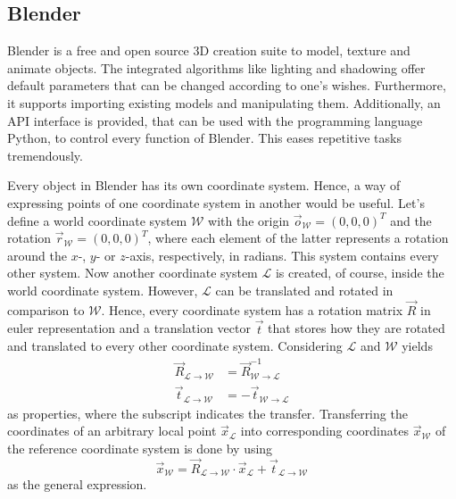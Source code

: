 \subsection{Blender}
\label{sec:software-blender}
Blender is a free and open source 3D creation suite to model, texture and animate objects.
The integrated algorithms like lighting and shadowing offer default parameters that can be changed according to one's wishes.
Furthermore, it supports importing existing models and manipulating them.
Additionally, an API interface is provided, that can be used with the programming language Python, to control every function of Blender.
This eases repetitive tasks tremendously.

Every object in Blender has its own coordinate system.
Hence, a way of expressing points of one coordinate system in another would be useful.
Let's define a world coordinate system $\mathcal{W}$ with the origin $\vec{o}_\mathcal{W} = (0,0,0)^T$ and the rotation $\vec{r}_{\mathcal{W}} = (0,0,0)^T$, where each element of the latter represents a rotation around the $x$-, $y$- or $z$-axis, respectively, in radians.
This system contains every other system.
Now another coordinate system $\mathcal{L}$ is created, of course, inside the world coordinate system.
However, $\mathcal{L}$ can be translated and rotated in comparison to $\mathcal{W}$.
Hence, every coordinate system has a rotation matrix $\vec{R}$ in euler representation and a translation vector $\vec{t}$ that stores how they are rotated and translated to every other coordinate system.
Considering $\mathcal{L}$ and $\mathcal{W}$ yields
\begin{align}
	\vec{R}_{\mathcal{L} \rightarrow \mathcal{W}} &= \vec{R}_{\mathcal{W} \rightarrow \mathcal{L}}^{-1} \\
	\vec{t}_{\mathcal{L} \rightarrow \mathcal{W}} &= - \vec{t}_{\mathcal{W} \rightarrow \mathcal{L}}
\end{align}
as properties, where the subscript indicates the transfer.
Transferring the coordinates of an arbitrary local point $\vec{x}_{\mathcal{L}}$ into corresponding coordinates $\vec{x}_{\mathcal{W}}$ of the reference coordinate system is done by using
\begin{equation}
	\vec{x}_{\mathcal{W}} = \vec{R}_{\mathcal{L} \rightarrow \mathcal{W}} \cdot \vec{x}_{\mathcal{L}} + \vec{t}_{\mathcal{L} \rightarrow \mathcal{W}}
\end{equation}
as the general expression.